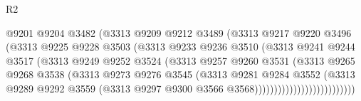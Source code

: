 \begin{lexlean}{R2}
\begin{coremodule}
                                @9201
                                @9204
                                @3482
                                (@3313
                                  @9209
                                  @9212
                                  @3489
                                  (@3313
                                    @9217
                                    @9220
                                    @3496
                                    (@3313
                                      @9225
                                      @9228
                                      @3503
                                      (@3313
                                        @9233
                                        @9236
                                        @3510
                                        (@3313
                                          @9241
                                          @9244
                                          @3517
                                          (@3313
                                            @9249
                                            @9252
                                            @3524
                                            (@3313
                                              @9257
                                              @9260
                                              @3531
                                              (@3313
                                                @9265
                                                @9268
                                                @3538
                                                (@3313
                                                  @9273
                                                  @9276
                                                  @3545
                                                  (@3313
                                                    @9281
                                                    @9284
                                                    @3552
                                                    (@3313
                                                      @9289
                                                      @9292
                                                      @3559
                                                      (@3313
                                                        @9297
                                                        @9300
                                                        @3566
                                                        @3568))))))))))))))))))))))))))

\end{coremodule}
\end{lexlean}

